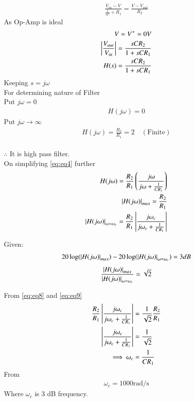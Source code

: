 \documentclass[journal,12pt,twocolumn]{IEEEtran}
\theoremstyle{remark}
\begin{document}
\begin{align}
\frac{V_{in}-V}{\frac{1}{sC}+R_1}=\frac{V-V_{out}}{R_2}
\end{align}
As Op-Amp is ideal
\begin{align}
V=V^+=0V\\
\left\vert\frac{V_{out}}{V_{in}}\right\vert=\frac{sCR_2}{1+sCR_1}\\
H(s)=\frac{sCR_2}{1+sCR_1}
\label{eq:eq4}
\end{align}
Keeping $s=j\omega$\\
For determining nature of Filter\\
Put $j\omega=0$
\begin{align}
H(j\omega)=0
\end{align}
Put $j\omega\rightarrow \infty$
\begin{align}
H(j\omega)=\frac{R_2}{R_1}=2\quad (\text{Finite})
\end{align}\\
$\therefore$ It is high pass filter.\\

On simplifying \eqref{eq:eq4} further
\begin{align}
H(j\omega)=\frac{R_2}{R_1}\left(\frac{j\omega}{j\omega+\frac{1}{CR_1}}\right)\\
\left\vert H(j\omega)\right\vert_{max}=\frac{R_2}{R_1} \label{eq:eq8}\\
\left\vert H(j\omega)\right\vert_{\omega=\omega_c}=\frac{R_2}{R_1}\left\vert\frac{j\omega_c}{j\omega_c+\frac{1}{CR_1}}\right\vert
\label{eq:eq9}
\end{align}

Given: 
\begin{align}
20\log(\left\vert H(j\omega)\right\vert_{max})-20\log(\left\vert H(j\omega)\right\vert_{\omega=\omega_c})=3 dB
\end{align}
\begin{align}
\frac{\left\vert H(j\omega)\right\vert_{max}}{\left\vert H(j\omega)\right\vert_{\omega=\omega_c}}=\sqrt 2
\end{align}
 
From \eqref{eq:eq8} and \eqref{eq:eq9}
\begin{align}
\frac{R_2}{R_1}\left\vert\frac{j\omega_c}{j\omega_c+\frac{1}{CR_1}}\right\vert&=\frac{1}{\sqrt 2}\frac{R_2}{R_1}\\
\left\vert\frac{j\omega_c}{j\omega_c+\frac{1}{CR_1}}\right\vert&=\frac{1}{\sqrt 2}\\
\implies \omega_c &= \frac{1}{CR_1}
\end{align}
From 
\begin{align}
\omega_c= 1000 \text{rad/s}
\end{align}
Where $\omega_c$ is 3 dB frequency.\\
\end{document}
